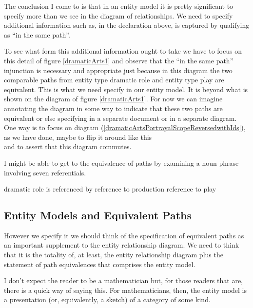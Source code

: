  The conclusion I come to is that in an entity model it is pretty significant to specify more than we see in the diagram of relationships. We need to specify additional information such as, in the declaration above,
 is captured by qualifying as ``in the same path''. 

To see what form this additional information ought to take we have to focus on this detail 
% 
of figure \ref{dramaticArts1}
and observe that the ``in the same path'' injunction is necessary
and appropriate just because in this diagram 
the two comparable paths from entity type dramatic role and entity type play are equivalent.
This is what we need specify in our entity model. It is beyond 
what is shown on the diagram of figure \ref{dramaticArts1}.
For now we can imagine annotating the diagram in some way to indicate that these two paths are equivalent 
or else specifying in a separate document or in a separate diagram. 
One way is to focus on diagram (\ref{dramaticArtsPortrayalScopeReversedwithIds}), 
as we have done, maybe to flip it around like this
\begin{equation}
\label{dramaticArtsPortrayalScopeAppearance1}

\end{equation}
and to assert that this diagram commutes.

\begin{noteforfuture}
I might be able to get to the equivalence of paths by examining
a noun phrase involving seven referentials.

dramatic role is referenced by reference to production reference to play
\end{noteforfuture}

\subsection{Entity Models and Equivalent Paths}
However we specify it we should think of the specification of equivalent paths as 
an important supplement to the entity relationship diagram. 
We need to think that it is the totality of, 
at least,
the entity relationship diagram  plus the statement of path equivalences that comprises the entity model.

I don't expect the reader to be a mathematician but, for those readers that are, there is a quick way of saying this. 
For mathematicians, then,  the entity model is a presentation (or, equivalently, a sketch)
 of a category of some kind.  


